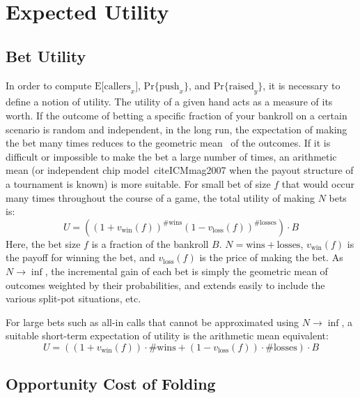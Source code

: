 \section{Expected Utility}

\subsection{Bet Utility}
\label{sec:Utility}

In order to compute $\mathrm{E[callers}_x]$, $\mathrm{Pr\{push}_x\}$, and $\mathrm{Pr\{raised}_y\}$, it is necessary to define a notion of utility.
The utility of a given hand acts as a measure of its worth.
If the outcome of betting a specific fraction of your bankroll on a certain scenario is random and independent, in the long run, the expectation of making the bet many times reduces to the geometric mean~\cite{KellyCriterion} of the outcomes.
If it is difficult or impossible to make the bet a large number of times, an arithmetic mean (or independent chip model~cite{ICMmag2007} when the payout structure of a tournament is known) is more suitable.
For small bet of size $f$ that would occur many times throughout the course of a game, the total utility of making $N$ bets is:
\[
U = \left( \left( 1 + v_\mathrm{win} \left( f \right) \right)^\mathrm{\# wins} \left( 1 - v_\mathrm{loss} \left( f \right) \right)^\mathrm{\# losses} \right) \cdot B
\]
Here, the bet size $f$ is a fraction of the bankroll $B$.
$N = \mathrm{wins} + \mathrm{losses}$, $v_\mathrm{win} \left( f \right)$ is the payoff for winning the bet, and $v_\mathrm{loss} \left( f \right)$ is the price of making the bet.
As $N \to \inf$, the incremental gain of each bet is simply the geometric mean of outcomes weighted by their probabilities, and extends easily to include the various split-pot situations, etc.

For large bets such as all-in calls that cannot be approximated using $N \to \inf$, a suitable short-term expectation of utility is the arithmetic mean equivalent:
\[
U = \left( \left( 1 + v_\mathrm{win} \left( f \right) \right) \cdot \mathrm{\# wins} + \left( 1 - v_\mathrm{loss} \left( f \right) \right) \cdot \mathrm{\# losses} \right) \cdot B
\]


\subsection{Opportunity Cost of Folding}
\label{sec:FoldEquity}

